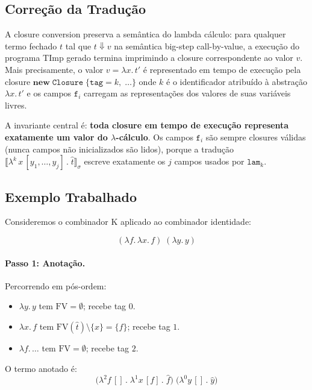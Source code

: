 \subsection{Correção da Tradução}

A closure conversion preserva a semântica do lambda cálculo: para
qualquer termo fechado \(t\) tal que \(t \Downarrow v\) na semântica
big-step call-by-value, a execução do programa TImp gerado termina
imprimindo a closure correspondente ao valor \(v\). Mais precisamente,
o valor \(v = \lambda x.\, t'\) é representado em tempo de execução
pela closure \(\mathbf{new}\;\mathtt{Closure}\;\{\mathtt{tag} =
k,\;\ldots\}\) onde \(k\) é o identificador atribuído à abstração
\(\lambda x.\, t'\) e os campos \(\mathtt{f}_i\) carregam as
representações dos valores de suas variáveis livres.

A invariante central é: \textbf{toda closure em tempo de execução
representa exatamente um valor do $\lambda$-cálculo}. Os campos
\(\mathtt{f}_i\) são sempre closures válidas (nunca campos não
inicializados são lidos), porque a tradução \(\llbracket \lambda^k\,
x\,[y_1,\ldots,y_j]\,.\;\hat{t}\rrbracket_\sigma\) escreve
exatamente os \(j\) campos usados por \(\mathtt{lam}_k\).

\subsection{Exemplo Trabalhado}

Consideremos o combinador K aplicado ao combinador identidade:

\[
  (\lambda f.\,\lambda x.\, f)\;(\lambda y.\, y)
\]

\paragraph{Passo 1: Anotação.}

Percorrendo em pós-ordem:
\begin{itemize}
  \item \(\lambda y.\, y\) tem \(\mathrm{FV} = \emptyset\); recebe tag \(0\).
  \item \(\lambda x.\, f\) tem \(\mathrm{FV}(\hat{t}) \setminus \{x\}
    = \{f\}\); recebe tag \(1\).
  \item \(\lambda f.\,\ldots\) tem \(\mathrm{FV} = \emptyset\);
    recebe tag \(2\).
\end{itemize}

O termo anotado é:
\[
  \bigl(\lambda^2 f\,[]\,.\;\lambda^1 x\,[f]\,.\;\hat{f}\bigr)\;
  \bigl(\lambda^0 y\,[]\,.\;\hat{y}\bigr)
\]

